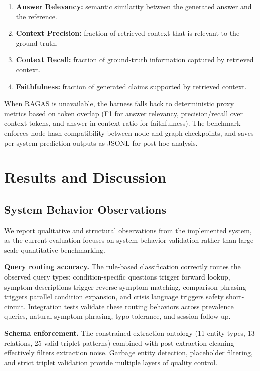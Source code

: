 \documentclass[12pt,a4paper]{article}
\begin{document}
\begin{enumerate}[nosep]
    \item \textbf{Answer Relevancy:} semantic similarity between the generated answer and the reference.
    \item \textbf{Context Precision:} fraction of retrieved context that is relevant to the ground truth.
    \item \textbf{Context Recall:} fraction of ground-truth information captured by retrieved context.
    \item \textbf{Faithfulness:} fraction of generated claims supported by retrieved context.
\end{enumerate}

When RAGAS is unavailable, the harness falls back to deterministic proxy metrics based on token overlap (F1 for answer relevancy, precision/recall over context tokens, and answer-in-context ratio for faithfulness). The benchmark enforces node-hash compatibility between node and graph checkpoints, and saves per-system prediction outputs as JSONL for post-hoc analysis.

\section{Results and Discussion}

\subsection{System Behavior Observations}

We report qualitative and structural observations from the implemented system, as the current evaluation focuses on system behavior validation rather than large-scale quantitative benchmarking.

\textbf{Query routing accuracy.} The rule-based classification correctly routes the observed query types: condition-specific questions trigger forward lookup, symptom descriptions trigger reverse symptom matching, comparison phrasing triggers parallel condition expansion, and crisis language triggers safety short-circuit. Integration tests validate these routing behaviors across prevalence queries, natural symptom phrasing, typo tolerance, and session follow-up.

\textbf{Schema enforcement.} The constrained extraction ontology (11 entity types, 13 relations, 25 valid triplet patterns) combined with post-extraction cleaning effectively filters extraction noise. Garbage entity detection, placeholder filtering, and strict triplet validation provide multiple layers of quality control.
\end{document}
